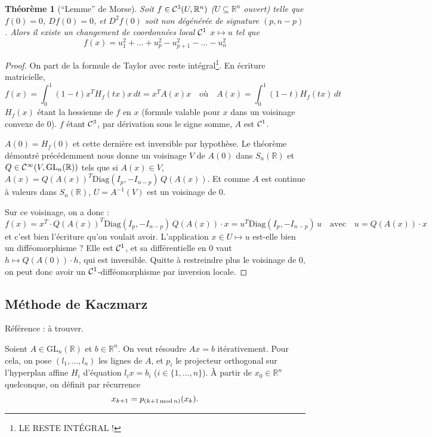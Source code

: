 \documentclass[a4paper, 11pt]{article}
\def\R{\mathbb{R}}
\def\Cf{{\cal{C}}}
\def\GL{\mathrm{GL}}
\def\Diag{\mathrm{Diag}}
\newtheorem*{theorem}{Théorème}
\begin{document}
\begin{theorem}[\enquote{Lemme} de Morse]
  Soit $f \in \Cf^3(U, \R^n)$ ($U \subseteq \R^n$ ouvert) telle que $f(0) = 0$,
  $Df(0) = 0$, et $D^2f(0)$ soit non dégénérée de signature $(p,n-p)$. Alors il
  existe un changement de coordonnées local $\Cf^1$ $x \mapsto u$ tel que
  \[ f(x) = u_1^2 + \ldots + u_p^2 - u_{p+1}^2 - \ldots - u_n^2 \]
\end{theorem}
\begin{proof}
  On part de la formule de Taylor avec reste intégral\footnote{LE RESTE INTÉGRAL
    !}. En écriture matricielle,
  \[ f(x) = \int_0^1 (1-t)x^T H_f(tx) x\, dt = x^TA(x)x
    \quad \text{où} \quad A(x) = \int_0^1 (1-t) H_f(tx) \,dt  \]
  $H_f(x)$ étant la hessienne de $f$ en $x$ (formule valable pour $x$ dans un
  voisinage convexe de 0). $f$ étant $\Cf^3$, par dérivation sous le signe
  somme, $A$ est $\Cf^1$.

  $A(0) = H_f(0)$ et cette dernière est inversible par hypothèse. Le théorème
  démontré précédemment nous donne un voisinage $V$ de $A(0)$ dans $S_n(\R)$ et
  $Q \in \Cf^\infty(V, \GL_n(\R))$ tels que si $A(x) \in V$, $A(x) = Q(A(x))^T
  \Diag(I_p, -I_{n-p})\, Q(A(x))$. Et comme $A$ est continue à valeurs dans
  $S_n(\R)$, $U = A^{-1}(V)$ est un voisinage de $0$.

  Sur ce voisinage, on a donc :
  \[ f(x) = x^T \cdot Q(A(x))^T\Diag(I_p, -I_{n-p})\,Q(A(x)) \cdot x
    = u^T \Diag(I_p, -I_{n-p})\, u \quad \text{avec} \quad
    u = Q(A(x)) \cdot x
  \]
  et c'est bien l'écriture qu'on voulait avoir. L'application $x \in U \mapsto
  u$ est-elle bien un difféomorphisme ? Elle est $\Cf^1$, et sa différentielle
  en 0 vaut $h \mapsto Q(A(0)) \cdot h$, qui est inversible. Quitte à
  restreindre plus le voisinage de 0, on peut donc avoir un
  $\Cf^1$-difféomorphisme par inversion locale.
\end{proof}

\newpage

\subsection{Méthode de Kaczmarz}

Référence : à trouver.

Soient $A \in \GL_n(\R)$ et $b \in \R^n$. On veut résoudre $Ax = b$
itérativement. Pour cela, on pose $(l_1, \ldots, l_n)$ les lignes de $A$, et
$p_i$ le projecteur orthogonal sur l'hyperplan affine $H_i$ d'équation $l_ix =
b_i$ ($i \in \{1, \ldots, n\}$). À partir de $x_0 \in \R^n$ quelconque, on
définit par récurrence
\[ x_{k+1} = p_{(k+1\, \textnormal{mod}\, n)}(x_k). \]
\end{document}
